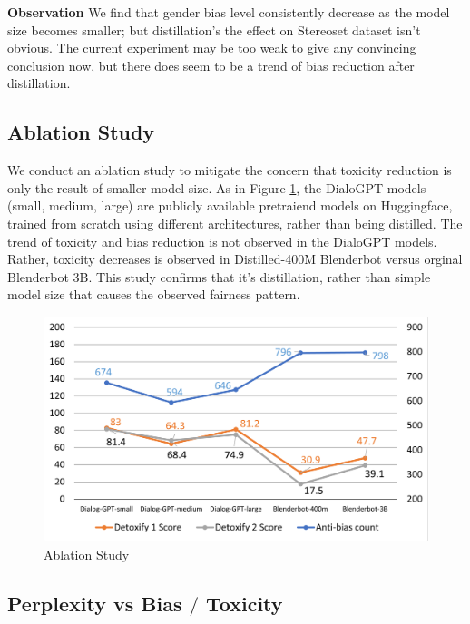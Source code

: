 \noindent \textbf{Observation} \quad We find that gender bias level consistently decrease as the model size becomes smaller; but distillation's the effect on Stereoset dataset isn't obvious. The current experiment may be too weak to give any convincing conclusion now, but there does seem to be a trend of bias reduction after distillation.


\subsection{Ablation Study}

We conduct an ablation study to mitigate the concern that toxicity reduction is only the result of smaller model size. As in Figure \ref{fig: Ablation}, the DialoGPT \cite{Zhang2020DIALOGPTL} models (small, medium, large) are publicly available pretraiend models on Huggingface, trained from scratch using different architectures, rather than being distilled. The trend of toxicity and bias reduction is not observed in the DialoGPT models. Rather, toxicity decreases is observed in Distilled-400M Blenderbot versus orginal Blenderbot 3B. This study confirms that it's distillation, rather than simple model size that causes the observed fairness pattern. \\

\begin{figure}[ht!]
\includegraphics[scale = 0.48]{graphs/bias_toxicity.png}
\caption{Ablation Study}
\centering
\label{fig: Ablation}
\end{figure}


\subsection{Perplexity vs Bias $/$ Toxicity}

